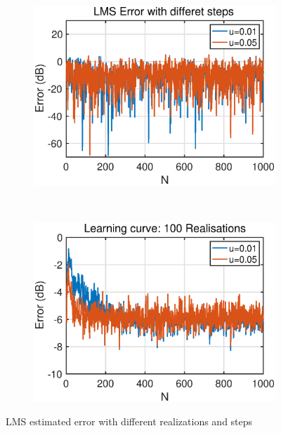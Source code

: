\begin{figure}[htp]
     \centering
     \begin{subfigure}[b]{0.4\textwidth}
         \centering
         \includegraphics[width=\textwidth]{fig/21/21b1.eps}
     \end{subfigure}
     ~
     \begin{subfigure}[b]{0.4\textwidth}
         \centering
         \includegraphics[width=\textwidth]{fig/21/21b2.eps}
     \end{subfigure}
        \caption{LMS estimated error with different realizations and steps}
        \label{fig:2_1_b}
\end{figure}
